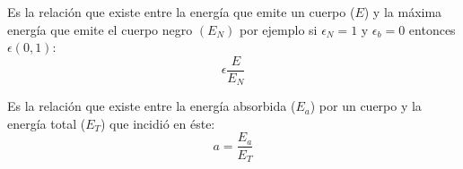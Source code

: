 \begin{definition}[Emisividad $(\xi)$]
    Es la relación que existe entre la energía que emite un cuerpo ($E$) y la máxima energía que emite el cuerpo negro $(E_N)$ por ejemplo si $\epsilon_N=1$ y $\epsilon_b=0$ entonces $\epsilon\left(0,1\right)$:
    \begin{equation}
        \epsilon \frac{E}{E_N}
    \end{equation}
\end{definition}
\begin{definition}[Absorción ($a$)]
    Es la relación que existe entre la energía absorbida ($E_a$) por un cuerpo y la energía total ($E_T$) que incidió en éste:
    \begin{equation}
        a =\frac{E_a}{E_T}
    \end{equation}
\end{definition}

